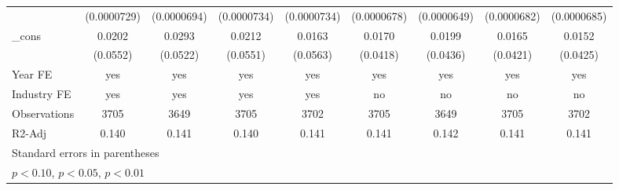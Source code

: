 \begin{table}[htbp]
\begin{tabular}{l*{8}{c}}
                    & (0.0000729)         & (0.0000694)         & (0.0000734)         & (0.0000734)         & (0.0000678)         & (0.0000649)         & (0.0000682)         & (0.0000685)         \\
\_cons              &      0.0202         &      0.0293         &      0.0212         &      0.0163         &      0.0170         &      0.0199         &      0.0165         &      0.0152         \\
                    &    (0.0552)         &    (0.0522)         &    (0.0551)         &    (0.0563)         &    (0.0418)         &    (0.0436)         &    (0.0421)         &    (0.0425)         \\
\hline
Year FE             &         yes         &         yes         &         yes         &         yes         &         yes         &         yes         &         yes         &         yes         \\
Industry FE         &         yes         &         yes         &         yes         &         yes         &          no         &          no         &          no         &          no         \\
Observations        &        3705         &        3649         &        3705         &        3702         &        3705         &        3649         &        3705         &        3702         \\
R2-Adj              &       0.140         &       0.141         &       0.140         &       0.141         &       0.141         &       0.142         &       0.141         &       0.141         \\
\hline\hline
\multicolumn{9}{l}{\footnotesize Standard errors in parentheses}\\
\multicolumn{9}{l}{\footnotesize \sym{*} \(p<0.10\), \sym{**} \(p<0.05\), \sym{***} \(p<0.01\)}\\
\end{tabular}
\end{table}
